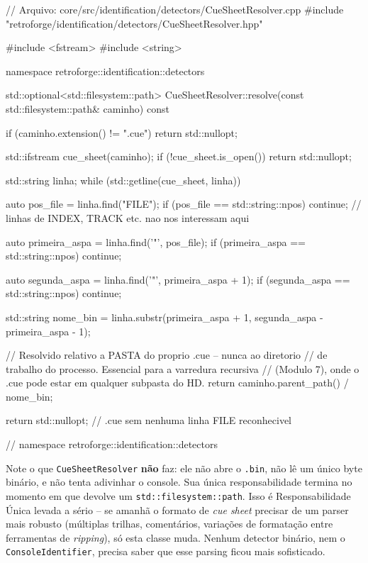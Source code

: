 \begin{CaixaCodigo}
// Arquivo: core/src/identification/detectors/CueSheetResolver.cpp
#include "retroforge/identification/detectors/CueSheetResolver.hpp"

#include <fstream>
#include <string>

namespace retroforge::identification::detectors {

std::optional<std::filesystem::path>
CueSheetResolver::resolve(const std::filesystem::path& caminho) const {
    if (caminho.extension() != ".cue") {
        return std::nullopt;
    }

    std::ifstream cue_sheet(caminho);
    if (!cue_sheet.is_open()) {
        return std::nullopt;
    }

    std::string linha;
    while (std::getline(cue_sheet, linha)) {
        auto pos_file = linha.find("FILE");
        if (pos_file == std::string::npos) {
            continue; // linhas de INDEX, TRACK etc. nao nos interessam aqui
        }

        auto primeira_aspa = linha.find('"', pos_file);
        if (primeira_aspa == std::string::npos) {
            continue;
        }

        auto segunda_aspa = linha.find('"', primeira_aspa + 1);
        if (segunda_aspa == std::string::npos) {
            continue;
        }

        std::string nome_bin =
            linha.substr(primeira_aspa + 1, segunda_aspa - primeira_aspa - 1);

        // Resolvido relativo a PASTA do proprio .cue -- nunca ao diretorio
        // de trabalho do processo. Essencial para a varredura recursiva
        // (Modulo 7), onde o .cue pode estar em qualquer subpasta do HD.
        return caminho.parent_path() / nome_bin;
    }

    return std::nullopt; // .cue sem nenhuma linha FILE reconhecivel
}

} // namespace retroforge::identification::detectors
\end{CaixaCodigo}

\begin{CaixaAlerta}
Note o que \texttt{CueSheetResolver} \textbf{não} faz: ele não abre o \texttt{.bin}, não lê um único byte binário, e não tenta adivinhar o console. Sua única responsabilidade termina no momento em que devolve um \texttt{std::filesystem::path}. Isso é Responsabilidade Única levada a sério -- se amanhã o formato de \textit{cue sheet} precisar de um parser mais robusto (múltiplas trilhas, comentários, variações de formatação entre ferramentas de \textit{ripping}), só esta classe muda. Nenhum detector binário, nem o \texttt{ConsoleIdentifier}, precisa saber que esse parsing ficou mais sofisticado.
\end{CaixaAlerta}

